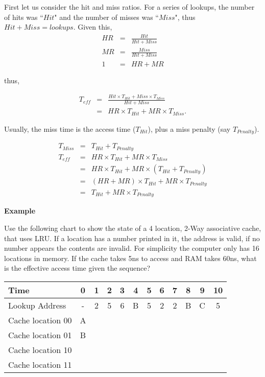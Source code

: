 First let us consider the hit and miss ratios.  For a series of lookups, the number of hits was ``$Hit$" and the number of misses was ``$Miss$", thus $Hit+Miss=lookups$.  Given this,
\begin{eqnarray*}
  HR &=& \frac{Hit}{Hit+Miss} \\
  MR &=& \frac{Miss}{Hit+Miss} \\
  1 &=& HR+MR
\end{eqnarray*}

thus,

\begin{eqnarray*}
  T_{eff} &=& \frac{Hit\times T_{Hit}+Miss\times T_{Miss}}{Hit+Miss} \\
          &=& HR\times T_{Hit}+MR\times T_{Miss}.
\end{eqnarray*}

Usually, the miss time is the access time ($T_{Hit}$), plus a miss penalty (say $T_{Penalty}$).

\begin{eqnarray*}
  T_{Miss}&=& T_{Hit}+T_{Penalty} \\
  T_{eff} &=& HR\times T_{Hit}+MR\times T_{Miss} \\
          &=& HR\times T_{Hit}+MR\times (T_{Hit}+T_{Penalty}) \\
          &=& (HR+MR)\times T_{Hit}+MR\times T_{Penalty} \\
          &=& T_{Hit}+MR\times T_{Penalty}
\end{eqnarray*}





\vspace{.1in}\noindent
\textbf{Example}


Use the following chart to show the state of a 4 location, 2-Way associative cache, that uses LRU.  If a location has a number printed in it, the address is valid, if no number appears the contents are invalid.  For simplicity the computer only has 16 locations in memory.  If the cache takes 5ns to access and RAM takes 60ns, what is the effective access time given the sequence?

\begin{tabular}{|l|c|c|c|c|c|c|c|c|c|c|c|} \hline
Time              & 0 & 1 & 2 & 3 & 4 & 5 & 6 & 7 & 8 & 9 & 10 \\ \hline
Lookup Address    & - & 2 & 5 & 6 & B & 5 & 2 & 2 & B & C & 5  \\ \hline
Cache location 00 & A &   &   &   &   &   &   &   &   &   &    \\ \hline
Cache location 01 & B &   &   &   &   &   &   &   &   &   &    \\ \hline
Cache location 10 &   &   &   &   &   &   &   &   &   &   &    \\ \hline
Cache location 11 &   &   &   &   &   &   &   &   &   &   &    \\ \hline
\end{tabular}

